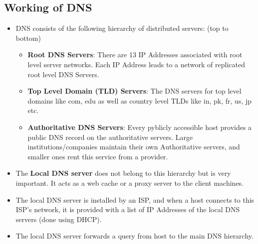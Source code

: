 \documentclass{article}
\theoremstyle{plain}
\theoremstyle{definition}
\begin{document}
\subsection{Working of DNS}
\begin{itemize}
    \item DNS consists of the following hierarchy of distributed servers: (top to bottom)
    \begin{itemize}
        \item \textbf{Root DNS Servers}: There are 13 IP Addresses associated with root level server networks. Each IP Address leads to a network of replicated root level DNS Servers. 
        
        \item \textbf{Top Level Domain (TLD) Servers}: The DNS servers for top level domains like com, edu as well as country level TLDs like in, pk, fr, us, jp etc.
        
        \item \textbf{Authoritative DNS Servers}: Every pyblicly accessible host provides a public DNS record on the authoritative servers. Large institutions/companies maintain their own Authoritative servers, and smaller ones rent this service from a provider. 
    \end{itemize}
    
    \item The \textbf{Local DNS server} does not belong to this hierarchy but is very important. It acts as a web cache or a proxy server to the client machines. 
    
    \item The local DNS server is installed by an ISP, and when a host connects to this ISP's network, it is provided with a list of IP Addresses of the local DNS servers (done using DHCP).
    
    \item The local DNS server forwards a query from host to the main DNS hierarchy.
\end{itemize}
\end{document}
